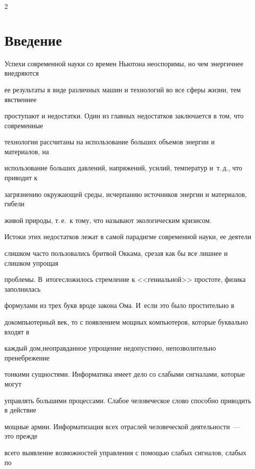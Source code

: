 \begin{multicols}{2}
\section{Введение}





Успехи современной науки со времен Ньютона неоспоримы, но чем энергичнее внедряются 


ее результаты в виде различных машин и технологий во все сферы жизни, тем явственнее 


проступают и недостатки. Один из главных недостатков заключается в том, что современные 


технологии рассчитаны на использование больших объемов энергии и материалов, на 


использование больших давлений, напряжений, усилий, температур и~т.\,д., что приводит к 


загрязнению окружающей среды, исчерпанию источников энергии и материалов, гибели 


живой природы, т.\,е.\ к тому, что называют экологическим кризисом.


      


      Истоки этих недостатков лежат в самой парадигме современной науки, ее деятели 


слишком часто пользовались бритвой Оккама, срезая как бы все лишнее и слишком упрощая 


проблемы. В~итоге\linebreak сложилось стремление к <<гениальной>> простоте, физика заполнилась 


формулами из трех букв вроде закона Ома. И~если это было простительно в 


докомпьютерный век, то с появлением мощных компьютеров, которые буквально входят в 


каждый дом,\linebreak неоправданное упрощение недопустимо, непозволительно пренебрежение 


тонкими сущностями. Информатика имеет дело со слабыми сигналами, которые могут 


управлять большими процессами. Слабое человеческое слово способно приводить в действие 


мощные армии. Информатизация всех отраслей человеческой деятельности~--- это прежде 


всего выявление возможностей управ\-ле\-ния с по\-мощью слабых сигналов, слабых по 



\end{multicols}
